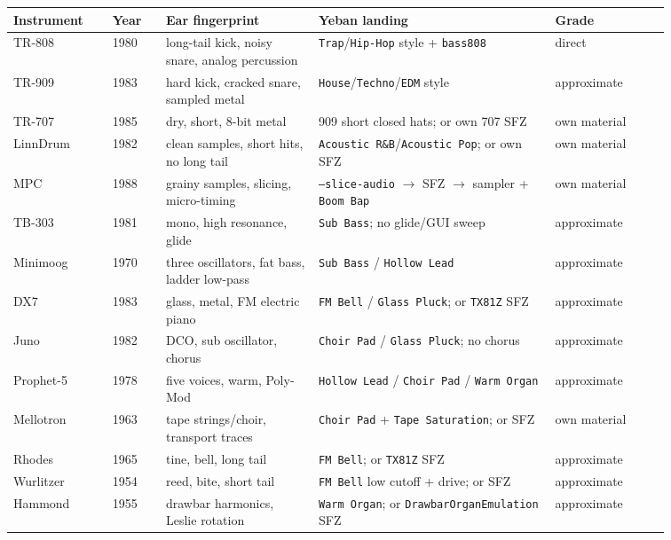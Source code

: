 \begin{longtable}{p{0.13\linewidth}p{0.07\linewidth}p{0.20\linewidth}p{0.31\linewidth}p{0.15\linewidth}}
\hline
Instrument & Year & Ear fingerprint & Yeban landing & Grade \\
\hline
\endhead
TR-808 & 1980 & long-tail kick, noisy snare, analog percussion &
\texttt{Trap}/\texttt{Hip-Hop} style + \texttt{bass808} & direct \\
TR-909 & 1983 & hard kick, cracked snare, sampled metal &
\texttt{House}/\texttt{Techno}/\texttt{EDM} style & approximate \\
TR-707 & 1985 & dry, short, 8-bit metal & 909 short closed hats; or own
707 SFZ & own material \\
LinnDrum & 1982 & clean samples, short hits, no long tail &
\texttt{Acoustic R\&B}/\texttt{Acoustic Pop}; or own SFZ & own material \\
MPC & 1988 & grainy samples, slicing, micro-timing &
\texttt{--slice-audio} $\to$ SFZ $\to$ sampler + \texttt{Boom Bap} & own
material \\
TB-303 & 1981 & mono, high resonance, glide & \texttt{Sub Bass}; no glide/GUI
sweep & approximate \\
Minimoog & 1970 & three oscillators, fat bass, ladder low-pass &
\texttt{Sub Bass} / \texttt{Hollow Lead} & approximate \\
DX7 & 1983 & glass, metal, FM electric piano & \texttt{FM Bell} /
\texttt{Glass Pluck}; or \texttt{TX81Z} SFZ & approximate \\
Juno & 1982 & DCO, sub oscillator, chorus & \texttt{Choir Pad} /
\texttt{Glass Pluck}; no chorus & approximate \\
Prophet-5 & 1978 & five voices, warm, Poly-Mod & \texttt{Hollow Lead} /
\texttt{Choir Pad} / \texttt{Warm Organ} & approximate \\
Mellotron & 1963 & tape strings/choir, transport traces & \texttt{Choir Pad} +
\texttt{Tape Saturation}; or SFZ & own material \\
Rhodes & 1965 & tine, bell, long tail & \texttt{FM Bell}; or \texttt{TX81Z}
SFZ & approximate \\
Wurlitzer & 1954 & reed, bite, short tail & \texttt{FM Bell} low cutoff +
drive; or SFZ & approximate \\
Hammond & 1955 & drawbar harmonics, Leslie rotation & \texttt{Warm Organ};
or \texttt{DrawbarOrganEmulation} SFZ & approximate \\
\hline
\end{longtable}

